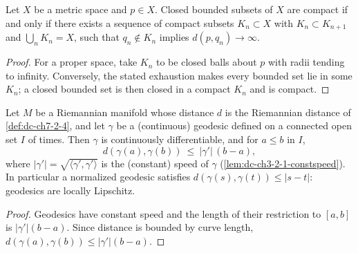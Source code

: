 \begin{lemma}

  \label{lem:dc-ch7-2-8-b-iff-e}
  \leanok
Let $X$ be a metric space and $p\in X$. Closed bounded subsets of $X$ are
  compact if and only if there exists a sequence of compact subsets
  $K_n\subset X$ with $K_n\subset K_{n+1}$ and $\bigcup_n K_n=X$, such that
  $q_n\notin K_n$ implies $d(p,q_n)\to\infty$.
\end{lemma}
\begin{proof}

  \leanok
\sketch For a proper space, take $K_n$ to be closed balls about $p$ with radii tending to infinity. Conversely, the stated exhaustion makes every bounded set lie in some $K_n$; a closed bounded set is then closed in a compact $K_n$ and is compact.
\end{proof}

\begin{lemma}

  \label{lem:dc-ch7-2-8-lipschitz}
  \leanok
Let $M$ be a Riemannian manifold whose distance $d$ is the Riemannian
  distance of \cref{def:dc-ch7-2-4}, and let $\gamma$ be a (continuous)
  geodesic defined on a connected open set $I$ of times. Then $\gamma$ is
  continuously differentiable, and for $a\le b$ in $I$,
  $$
  d(\gamma(a),\gamma(b))\ \le\ |\gamma'|\,(b-a),
  $$
  where $|\gamma'|=\sqrt{\langle\gamma',\gamma'\rangle}$ is the (constant)
  speed of $\gamma$ (\cref{lem:dc-ch3-2-1-constspeed}). In particular a
  normalized geodesic satisfies $d(\gamma(s),\gamma(t))\le|s-t|$: geodesics
  are locally Lipschitz.
\end{lemma}
\begin{proof}

  \leanok
\sketch Geodesics have constant speed and the length of their restriction to $[a,b]$ is $|\gamma'|(b-a)$. Since distance is bounded by curve length, $d(\gamma(a),\gamma(b))\le |\gamma'|(b-a)$.
\end{proof}

